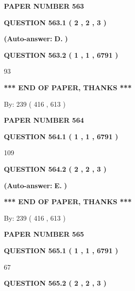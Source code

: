 \documentclass{ctexart}
\begin{document}
   
\newpage 
\setcounter{page}{ 
   563001 } 
   
   
 {\textbf{ \Large{ PAPER NUMBER  563  }}}
   
   
   
   
  
  
{\textbf{\large{QUESTION
563.1 
 ( 2 , 2 , 3 )
}}}
 
 
{\textbf{(Auto-answer:}}
{\textbf{\large{
D.}}}
{\textbf{)}}
 
 
  
  
{\textbf{\large{QUESTION
563.2 
 ( 1 , 1 , 6791 )
}}}

93
   
   
   
   
\vspace{1.0in} 
{\textbf{\large{ *** END OF PAPER, THANKS *** }}} 
   
   
\hspace{1.0in} By: 
 239 ( 416 ,  613 )
   
   
   
   
\newpage 
\setcounter{page}{ 
   564001 } 
   
   
 {\textbf{ \Large{ PAPER NUMBER  564  }}}
   
   
   
   
  
  
{\textbf{\large{QUESTION
564.1 
 ( 1 , 1 , 6791 )
}}}

109
  
  
{\textbf{\large{QUESTION
564.2 
 ( 2 , 2 , 3 )
}}}
 
 
{\textbf{(Auto-answer:}}
{\textbf{\large{
E.}}}
{\textbf{)}}
 
 
   
   
   
   
\vspace{1.0in} 
{\textbf{\large{ *** END OF PAPER, THANKS *** }}} 
   
   
\hspace{1.0in} By: 
 239 ( 416 ,  613 )
   
   
   
   
\newpage 
\setcounter{page}{ 
   565001 } 
   
   
 {\textbf{ \Large{ PAPER NUMBER  565  }}}
   
   
   
   
  
  
{\textbf{\large{QUESTION
565.1 
 ( 1 , 1 , 6791 )
}}}

67
  
  
{\textbf{\large{QUESTION
565.2 
 ( 2 , 2 , 3 )
}}}
 
\end{document}
